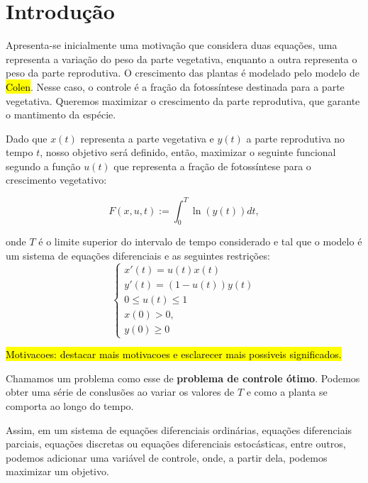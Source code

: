 \section{Introdução}

\begin{example}
    Apresenta-se inicialmente uma motivação que considera duas equações, uma
    representa a variação do peso da parte vegetativa, enquanto a outra representa
    o peso da parte reprodutiva. O crescimento das plantas é modelado pelo modelo
    de \hl{Colen}. Nesse caso, o controle é a fração da fotossíntese destinada
    para a parte vegetativa. Queremos maximizar o crescimento da parte
    reprodutiva, que garante o mantimento da espécie. 

    Dado que $x(t)$ representa a parte vegetativa e $y(t)$ a parte reprodutiva no
    tempo $t$, nosso objetivo será definido, então, maximizar o seguinte
    funcional segundo a função $u(t)$ que representa a fração de fotossíntese para
    o crescimento vegetativo: 

    \begin{equation}
    F(x,u,t) := \int_0^T \ln(y(t))dt, 
    \end{equation}

    onde $T$ é o limite superior do intervalo de tempo considerado e tal que o modelo é um sistema de equações diferenciais e as seguintes
    restrições: 
    \begin{equation}
    \begin{cases}
    x'(t) = u(t)x(t) \\
    y'(t) = (1 - u(t))y(t) \\
    0 \leq u(t) \leq 1 \\
    x(0) > 0, \\
    y(0) \geq 0
    \end{cases}    
    \end{equation}
\end{example}

\hl{Motivacoes: destacar mais motivacoes e esclarecer mais possiveis significados.}

Chamamos um problema como esse de \textbf{problema de controle ótimo}. Podemos
obter uma série de conslusões ao variar os valores de $T$ e como a planta se
comporta ao longo do tempo. 

Assim, em um sistema de equações diferenciais ordinárias, equações
diferenciais parciais, equações discretas ou equações diferenciais
estocásticas, entre outros, podemos adicionar uma variável de controle, onde,
a partir dela, podemos maximizar um objetivo. 

